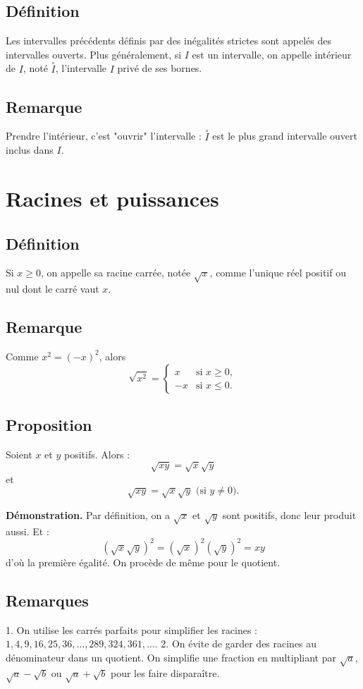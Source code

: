\documentclass{article}
\begin{document}
	\subsection{Définition }
	Les intervalles précédents définis par des inégalités strictes sont appelés des intervalles ouverts.
	Plus généralement, si $I$ est un intervalle, on appelle intérieur de $I$, noté $\stackrel{\circ}{I}$, l'intervalle $I$ privé de ses bornes.
	
	\subsection{Remarque }
	Prendre l'intérieur, c'est "ouvrir" l'intervalle : $\stackrel{\circ}{I}$ est le plus grand intervalle ouvert inclus dans $I$.
	
	\section{ Racines et puissances}
	
	\subsection{Définition }
	Si $x \geq 0$, on appelle sa racine carrée, notée $\sqrt{x}$, comme l'unique réel positif ou nul dont le carré vaut $x$.
	
	\subsection{Remarque }
	Comme $x^2 = (-x)^2$, alors
	\[ \sqrt{x^2} =
	\begin{cases}
		x & \text{si } x \geq 0, \\
		-x & \text{si } x \leq 0.
	\end{cases}
	\]
	
	\subsection{Proposition }
	Soient $x$ et $y$ positifs. Alors :
	\[ \sqrt{xy} = \sqrt{x} \sqrt{y} \]
	et
	\[ \sqrt{xy} = \sqrt{x} \sqrt{y} \text{ (si } y \neq 0 \text{).}\]
	
	\textbf{Démonstration.} Par définition, on a $\sqrt{x}$ et $\sqrt{y}$ sont positifs, donc leur produit aussi. Et :
	\[
	\left(\sqrt{x} \sqrt{y}\right)^2 = (\sqrt{x})^2 (\sqrt{y})^2 = xy
	\]
	d'où la première égalité. On procède de même pour le quotient.
	
	\subsection{Remarques }
	1. On utilise les carrés parfaits pour simplifier les racines : $1, 4, 9, 16, 25, 36, \ldots, 289, 324, 361, \ldots$.
	2. On évite de garder des racines au dénominateur dans un quotient. On simplifie une fraction en multipliant par $\sqrt{a}$, $\sqrt{a} - \sqrt{b}$ ou $\sqrt{a} + \sqrt{b}$ pour les faire disparaître.
	
\end{document}
